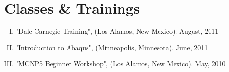 \normalsize
\section{Classes \& Trainings}
\begin{enumerate}[I.]%
	\item "Dale Carnegie Training", (Los Alamos, New Mexico). August, 2011 \vspace{3mm}
	\item "Introduction to Abaqus", (Minneapolis, Minnesota). June, 2011 \vspace{3mm}
	\item "MCNP5 Beginner Workshop", (Los Alamos, New Mexico). May, 2010 \vspace{3mm}
\end{enumerate}
